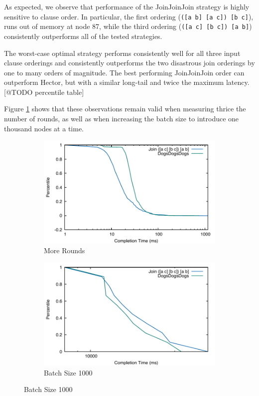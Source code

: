\documentclass[../catalog.tex]{subfiles}
\begin{document}
As expected, we observe that performance of the JoinJoinJoin strategy
is highly sensitive to clause order. In particular, the first ordering
(\texttt{([a b] [a c]) [b c]}), runs out of memory at node 87, while
the third ordering (\texttt{([a c] [b c]) [a b]}) consistently
outperforms all of the tested strategies.

The worst-case optimal strategy performs consistently well for all
three input clause orderings and consistently outperforms the two
disastrous join orderings by one to many orders of magnitude. The best
performing JoinJoinJoin order can outperform Hector, but with a
similar long-tail and twice the maximum latency. [@TODO percentile
  table]

Figure \ref{fig:triangle-cdfs-extended} shows that these observations
remain valid when measuring thrice the number of rounds, as well as
when increasing the batch size to introduce one thousand nodes at a
time.

\begin{figure}[h!]
  \begin{subfigure}{.5\textwidth}
    \includegraphics[width=1.0\linewidth]{results/triangles/out/extended_cdf}
    \caption{More Rounds}
  \end{subfigure}
  \begin{subfigure}{.5\textwidth}
    \includegraphics[width=1.0\linewidth]{results/triangles/out/batch_cdf}
    \caption{Batch Size 1000}
  \end{subfigure}

  \label{fig:triangle-cdfs-extended}
\end{figure}
\end{document}
